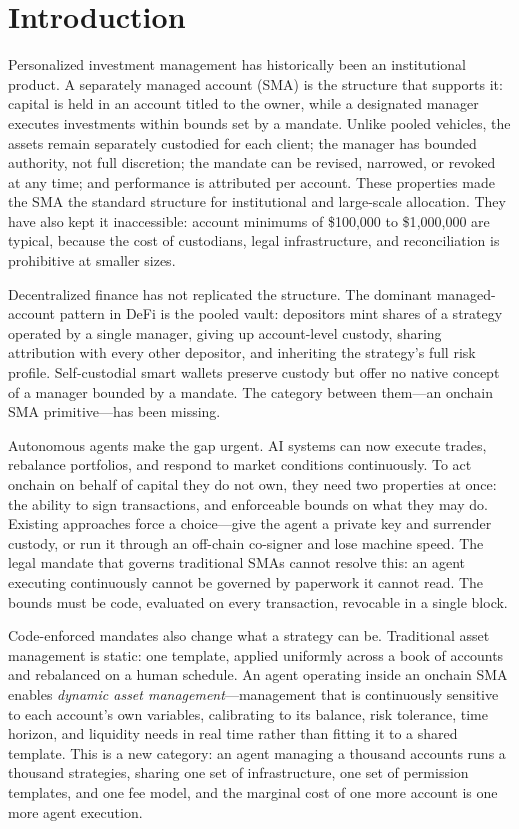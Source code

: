 \documentclass[11pt]{article}
\begin{document}
\newpage

\section{Introduction}

Personalized investment management has historically been an institutional product. A separately managed account (SMA) is the structure that supports it: capital is held in an account titled to the owner, while a designated manager executes investments within bounds set by a mandate. Unlike pooled vehicles, the assets remain separately custodied for each client; the manager has bounded authority, not full discretion; the mandate can be revised, narrowed, or revoked at any time; and performance is attributed per account. These properties made the SMA the standard structure for institutional and large-scale allocation. They have also kept it inaccessible: account minimums of \$100{,}000 to \$1{,}000{,}000 are typical, because the cost of custodians, legal infrastructure, and reconciliation is prohibitive at smaller sizes.

Decentralized finance has not replicated the structure. The dominant managed-account pattern in DeFi is the pooled vault: depositors mint shares of a strategy operated by a single manager, giving up account-level custody, sharing attribution with every other depositor, and inheriting the strategy's full risk profile. Self-custodial smart wallets preserve custody but offer no native concept of a manager bounded by a mandate. The category between them---an onchain SMA primitive---has been missing.

Autonomous agents make the gap urgent. AI systems can now execute trades, rebalance portfolios, and respond to market conditions continuously. To act onchain on behalf of capital they do not own, they need two properties at once: the ability to sign transactions, and enforceable bounds on what they may do. Existing approaches force a choice---give the agent a private key and surrender custody, or run it through an off-chain co-signer and lose machine speed. The legal mandate that governs traditional SMAs cannot resolve this: an agent executing continuously cannot be governed by paperwork it cannot read. The bounds must be code, evaluated on every transaction, revocable in a single block.

Code-enforced mandates also change what a strategy can be. Traditional asset management is static: one template, applied uniformly across a book of accounts and rebalanced on a human schedule. An agent operating inside an onchain SMA enables \emph{dynamic asset management}---management that is continuously sensitive to each account's own variables, calibrating to its balance, risk tolerance, time horizon, and liquidity needs in real time rather than fitting it to a shared template. This is a new category: an agent managing a thousand accounts runs a thousand strategies, sharing one set of infrastructure, one set of permission templates, and one fee model, and the marginal cost of one more account is one more agent execution.
\end{document}
